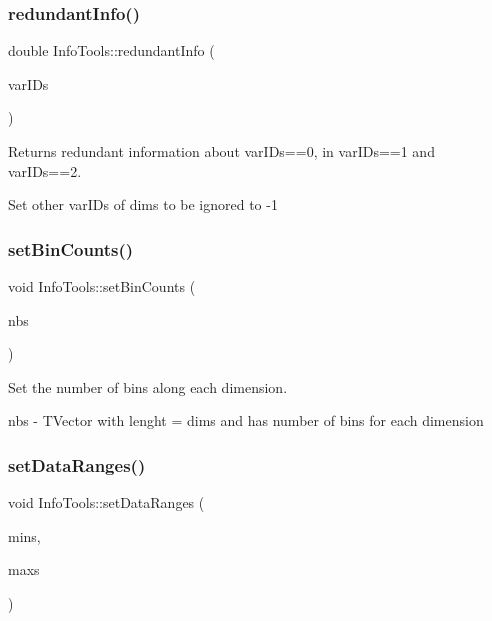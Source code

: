 \subsubsection{\texorpdfstring{redundant\+Info()}{redundantInfo()}}
{\footnotesize\ttfamily double Info\+Tools\+::redundant\+Info (\begin{DoxyParamCaption}\item[{T\+Vector$<$ int $>$ \&}]{var\+I\+Ds }\end{DoxyParamCaption})\hspace{0.3cm}{\ttfamily [inline]}}



Returns redundant information about var\+I\+Ds==0, in var\+I\+Ds==1 and var\+I\+Ds==2. 

Set other var\+I\+Ds of dims to be ignored to -\/1 \mbox{\label{class_info_tools_a43f55f31c65c762da3ae1026abd51465}} 
\subsubsection{\texorpdfstring{set\+Bin\+Counts()}{setBinCounts()}}
{\footnotesize\ttfamily void Info\+Tools\+::set\+Bin\+Counts (\begin{DoxyParamCaption}\item[{T\+Vector$<$ int $>$ \&}]{nbs }\end{DoxyParamCaption})\hspace{0.3cm}{\ttfamily [inline]}}



Set the number of bins along each dimension. 

nbs -\/ T\+Vector with lenght = dims and has number of bins for each dimension \mbox{\label{class_info_tools_aa16157a741626b58c79383fd131cb060}} 
\subsubsection{\texorpdfstring{set\+Data\+Ranges()}{setDataRanges()}}
{\footnotesize\ttfamily void Info\+Tools\+::set\+Data\+Ranges (\begin{DoxyParamCaption}\item[{T\+Vector$<$ double $>$ \&}]{mins,  }\item[{T\+Vector$<$ double $>$ \&}]{maxs }\end{DoxyParamCaption})\hspace{0.3cm}{\ttfamily [inline]}}



